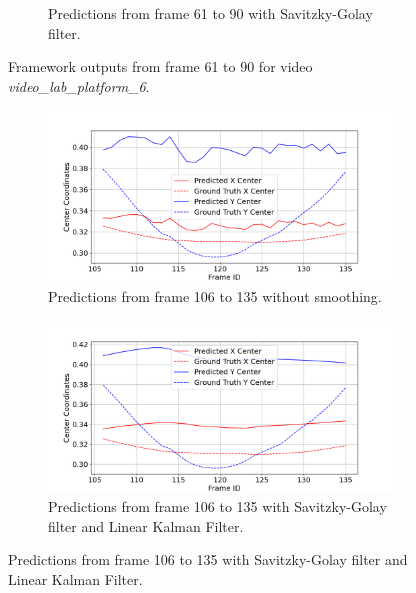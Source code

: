 \documentclass[12pt,oneside]{book} %
\begin{document}
\begin{figure}[H]
\begin{subfigure}[t]{0.9\textwidth}
        \caption{Predictions from frame 61 to 90 with Savitzky-Golay filter.}
        \label{fig:framework-video_lab_platform_6-1-sa}
    \end{subfigure}
    \caption{Framework outputs from frame 61 to 90 for video \textit{video\_lab\_platform\_6}.}
    \label{fig:framework-video_lab_platform_6-1}
\end{figure}

\begin{figure}[H]
    \centering
    \begin{subfigure}[t]{0.9\textwidth}
        \includegraphics[width=\textwidth]{figures/framework/video_lab_platform_6 Raw Data - 2.png}
        \caption{Predictions from frame 106 to 135 without smoothing.}
        \label{fig:framework-video_lab_platform_6-2-raw}
    \end{subfigure}
    \hfill
    \begin{subfigure}[t]{0.9\textwidth}
        \includegraphics[width=\textwidth]{figures/framework/video_lab_platform_6 LKF SA Filter - 2.png}
        \caption{Predictions from frame 106 to 135 with Savitzky-Golay filter and Linear Kalman Filter.}
        \label{fig:framework-video_lab_platform_6-2-sa-lkf}
    \end{subfigure}
    \vfill

\end{figure}
\end{document}
